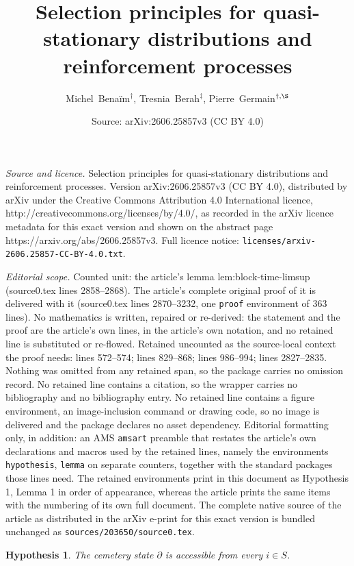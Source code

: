 \documentclass[10pt,a4paper]{amsart}
\title{Selection principles for quasi-stationary distributions and reinforcement processes}
\author{Michel~Bena\"im$^{\dagger}$, Tresnia~Berah$^{\ddagger}$, Pierre~Germain$^{\dagger,\S}$}
\date{Source: arXiv:2606.25857v3 (CC BY 4.0)}
\newtheorem{hypothesis}{Hypothesis}
\begin{document}
\maketitle

\noindent\emph{Source and licence.} Selection principles for quasi-stationary distributions and reinforcement processes. Version arXiv:2606.25857v3 (CC BY 4.0), distributed by arXiv under the Creative Commons Attribution 4.0 International licence, http://creativecommons.org/licenses/by/4.0/, as recorded in the arXiv licence metadata for this exact version and shown on the abstract page https://arxiv.org/abs/2606.25857v3. Full licence notice: \texttt{licenses/arxiv-2606.25857-CC-BY-4.0.txt}.\par\smallskip

\noindent\textit{Editorial scope.} Counted unit: the article's lemma lem:block-time-limsup (source0.tex lines 2858--2868). The article's complete original proof of it is delivered with it (source0.tex lines 2870--3232, one \texttt{proof} environment of 363 lines). No mathematics is written, repaired or re-derived: the statement and the proof are the article's own lines, in the article's own notation, and no retained line is substituted or re-flowed.  Retained uncounted as the source-local context the proof needs: lines 572--574; lines 829--868; lines 986--994; lines 2827--2835.  Nothing was omitted from any retained span, so the package carries no omission record.  No retained line contains a citation, so the wrapper carries no bibliography and no bibliography entry.  No retained line contains a figure environment, an image-inclusion command or drawing code, so no image is delivered and the package declares no asset dependency.  Editorial formatting only, in addition: an AMS \texttt{amsart} preamble that restates the article's own declarations and macros used by the retained lines, namely the environments \texttt{hypothesis}, \texttt{lemma} on separate counters, together with the standard packages those lines need.  The retained environments print in this document as Hypothesis 1, Lemma 1 in order of appearance, whereas the article prints the same items with the numbering of its own full document.  The complete native source of the article as distributed in the arXiv e-print for this exact version is bundled unchanged as \texttt{sources/203650/source0.tex}.
\begin{hypothesis}\label{hyp:main}
The cemetery state \(\partial\) is accessible from every \(i\in S\).
\end{hypothesis}
\end{document}
